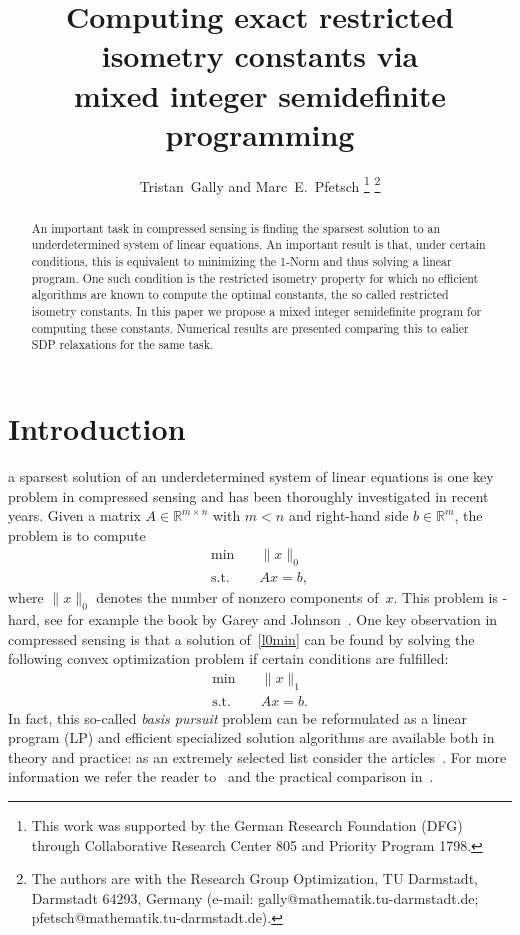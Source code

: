 \documentclass[journal]{IEEEtran}
\newcommand{\Norm}[2]{\lVert{#1}\rVert_{#2}}
\newcommand{\R}{\mathds{R}}
\newcommand{\NP}{\text{NP}}
\begin{document}
\title{Computing exact restricted isometry constants via\\ mixed integer semidefinite programming}
\author{Tristan~Gally and Marc~E.~Pfetsch
  \thanks{This work was supported by the German Research Foundation (DFG) through Collaborative Research Center 805 and Priority Program 1798.}
  \thanks{The  authors  are  with  the  Research  Group  Optimization,  TU  Darmstadt,
  Darmstadt  64293,  Germany  (e-mail:  gally@mathematik.tu-darmstadt.de;
  pfetsch@mathematik.tu-darmstadt.de).}}


\maketitle

\begin{abstract}
An important task in compressed sensing is finding the sparsest solution to an underdetermined system of linear equations. An important result is that, under certain conditions, this is equivalent to minimizing the 1-Norm and thus
solving a linear program. One such condition is the restricted isometry property for which no efficient algorithms are known to compute the optimal constants, the so called restricted isometry constants. In this paper we propose a
mixed integer semidefinite program for computing these constants. Numerical results are presented comparing this to ealier SDP relaxations for the same task.
\end{abstract}

\section{Introduction}

 a sparsest solution of an underdetermined system of linear
equations is one key problem in compressed sensing and has been
thoroughly investigated in recent years. Given a matrix $A \in \R^{m \times n}$ with $m < n$ and 
right-hand side $b \in \R^m$, the problem is to compute
\begin{align}\label{l0min}
 \min \quad & \Norm{x}{0} \tag{$P_0$}\\
 \text{s.t.} \quad & Ax = b, \nonumber
\end{align}
where $\Norm{x}{0}$ denotes the number of nonzero components of~$x$. This
problem is \NP-hard, see for example the book by Garey and
Johnson~\cite{GareyJohnson}. One key observation in compressed sensing is
that a solution of~\eqref{l0min} can be found by solving the following
convex optimization problem if certain conditions are fulfilled:
\begin{align}\label{l1min}
 \min \quad & \Norm{x}{1} \tag{$P_1$}\\
 \text{s.t.} \quad & Ax = b. \nonumber
\end{align}
In fact, this so-called \emph{basis pursuit} problem can be reformulated as
a linear program (LP) and efficient specialized solution algorithms are
available both in theory and practice: as an extremely selected list
consider the articles~\cite{BecBC11,CheDS99,OsbPT00,vdBF08}. For more
information we refer the reader to~\cite{FouR13} and the practical
comparison in~\cite{LorPT15}.
\end{document}
